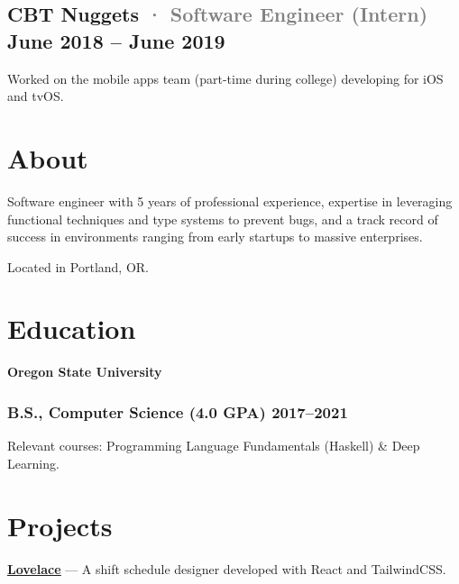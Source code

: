 \documentclass[10pt]{article} %
\let\defaultref\href
\renewcommand{\href}[2]{%
  \defaultref{#1}{\ul{#2}}%
}
\renewcommand{\emph}[1]{%
  \textcolor{gray}{#1}%
}
\begin{document}
\begin{paracol}{2}
\hypertarget{cbt-nuggets-software-engineer-intern-june-2018-june-2019}{%
\subsection{\texorpdfstring{CBT Nuggets \emph{· \small Software Engineer
(Intern)} \hfill \small June 2018 -- June
2019}{CBT Nuggets · Software Engineer (Intern) June 2018 -- June 2019}}\label{cbt-nuggets-software-engineer-intern-june-2018-june-2019}}

Worked on the mobile apps team (part-time during college) developing for
iOS and tvOS.

\switchcolumn

\hypertarget{about}{%
\section{About}\label{about}}

Software engineer with 5 years of professional experience, expertise in
leveraging functional techniques and type systems to prevent bugs, and a
track record of success in environments ranging from early startups to
massive enterprises.

Located in Portland, OR.

\raggedright

\hypertarget{education}{%
\section{Education}\label{education}}

\textbf{Oregon State University}

\hypertarget{b.s.-computer-science-4.0-gpa-20172021}{%
\subsubsection{B.S., Computer Science (4.0 GPA)
2017--2021}\label{b.s.-computer-science-4.0-gpa-20172021}}

Relevant courses: Programming Language Fundamentals (Haskell) \& Deep
Learning.

\hypertarget{projects}{%
\section{Projects}\label{projects}}

\textbf{\href{http://julianfortune.com/lovelace/}{Lovelace}} --- A shift
schedule designer developed with React and TailwindCSS.


\end{paracol}
\end{document}

